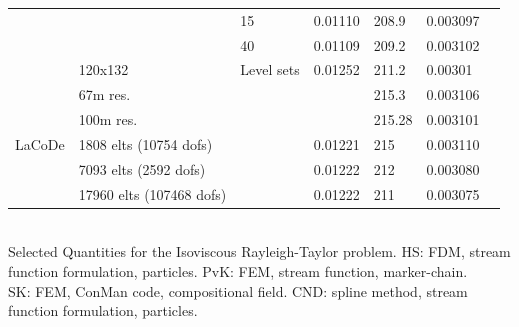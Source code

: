 \begin{center}
\begin{tabular}{lllllll}
&	 &15 	&0.01110 	&208.9 	&0.003097 & \\
&	 &40 	&0.01109 	&209.2 	&0.003102 & \\
\hline
& 120x132 & Level sets & 0.01252 & 211.2 & 0.00301 & \cite{sunh10} \\
\hline
& 67m res. &  & &   215.3  & 0.003106 & \cite{chtl13} \\
& 100m res. & & &   215.28 & 0.003101 & \\
\hline
LaCoDe 	& 1808 elts (10754 dofs)   &&0.01221 & 215& 0.003110 & \cite{demh19} \\
	& 7093 elts (2592 dofs)    &&0.01222 & 212& 0.003080 & \\
	& 17960 elts (107468 dofs) &&0.01222 & 211& 0.003075 & \\
\hline
\end{tabular}\\
{\captionfont Selected Quantities for the Isoviscous Rayleigh-Taylor problem.
HS: FDM, stream function formulation, particles.
PvK: FEM, stream function, marker-chain.\\
SK: FEM, ConMan code, compositional field. 
CND: spline method, stream function formulation, particles.
}
\end{center}


